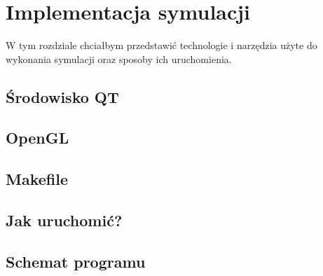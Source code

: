 \chapter{Implementacja symulacji}
\label{cha:implementacja}

W tym rozdziale chciałbym przedstawić technologie i narzędzia użyte do wykonania symulacji oraz sposoby ich uruchomienia.


\section{Środowisko QT}
\label{sec:qt}

\section{OpenGL}
\label{sec:opengl}

\section{Makefile}
\label{sec::makefile}

\section{Jak uruchomić?}
\label{sec::uruchomic}

\section{Schemat programu}
\label{sec::schemat}
